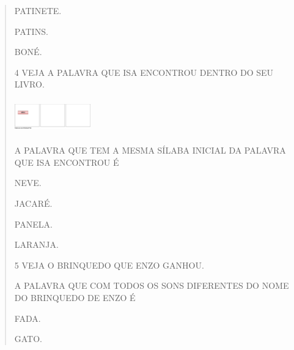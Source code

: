 \begin{escola}
{\begin{verse}
\begin{escolha}
\item PATINETE.

\item PATINS.

\item BONÉ.
\end{escolha}


\num{4} VEJA A PALAVRA QUE ISA ENCONTROU DENTRO DO SEU LIVRO.


\includegraphics[width=1.29722in,height=0.57917in]{media/image244.png}

A PALAVRA QUE TEM A MESMA SÍLABA INICIAL DA PALAVRA QUE ISA ENCONTROU É

\begin{escolha}
\item NEVE.

\item JACARÉ.

\item PANELA.

\item LARANJA.
\end{escolha}


\num{5} VEJA O BRINQUEDO QUE ENZO GANHOU.



A PALAVRA QUE COM TODOS OS SONS DIFERENTES DO NOME DO BRINQUEDO DE ENZO É

\begin{escolha}
\item FADA.

\item GATO.


\end{escolha}
\end{verse}}
\end{escola}
